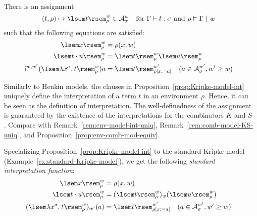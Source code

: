 \begin{prop} \label{prop:Kripke-model-int}
There is an assignment
\[ (t, \rho) \mapsto \ksint{t}{\rho}{w} \in \kscomp{\struct{A}}{\sigma}{w}
    \quad \text{for }\ctypedtm{\Gamma}{t}{\sigma} \text{ and } \ctypedenv{\rho}{\Gamma}{w} \]
such that the following equations are satisfied:
\begin{align}
\ksint{x}{\rho}{w} &= \rho(x, w) \\
\ksint{\app{t}{u}}{\rho}{w} &= \ksint{t}{\rho}{w} \ksint{u}{\rho}{w} \\
\kstran[][w,w'](\ksint{\lamv{x}{\sigma}{t}}{\rho}{w}) a &= \ksint{t}{\kupdenv{\rho}{x}{a}}{w'} \quad (a \in \kscomp{\struct{A}}{\sigma}{w'}, w' \ge w)
\end{align}
\end{prop}

\begin{rem}
Similarly to Henkin models, the clauses in Proposition~\ref{prop:Kripke-model-int} uniquely define the interpretation of a term $t$ in an environment $\rho$. Hence, it can be seen as the definition of interpretation. The well-definedness of the assignment is guaranteed by the existence of the interpretations for the combinators $K$ and $S$. Compare with Remark~\ref{rem:env-model-int-uniq}, Remark~\ref{rem:comb-model-KS-uniq}, and Proposition~\ref{prop:env-comb-mod-equiv}.
\end{rem}

\begin{ex}
Specializing Proposition~\ref{prop:Kripke-model-int} to the standard Kripke model (Example~\ref{ex:standard-Kripke-model}), we get the following \textit{standard interpretation function}:
\begin{align*}
\ksint{x}{\rho}{w} &= \rho(x, w) \\
\ksint{\app{t}{u}}{\rho}{w} &= (\ksint{t}{\rho}{w})_w(\ksint{u}{\rho}{w}) \\
(\ksint{\lamv{x}{\sigma}{t}}{\rho}{w})_{w'}(a) &= \ksint{t}{\kupdenv{\rho}{x}{a}}{w'} \quad (a \in \kscomp{\struct{A}}{\sigma}{w'}, w' \ge w)
\end{align*}
\end{ex}


